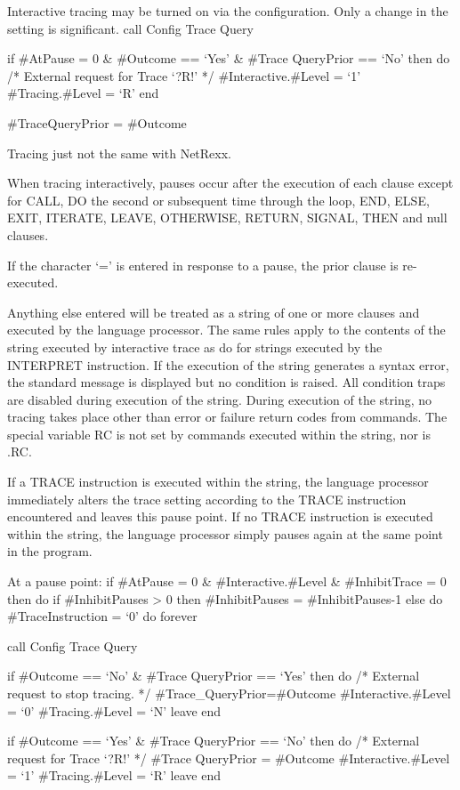 Interactive tracing may be turned on via the configuration. Only a
change in the setting is significant. call Config Trace Query

if \#AtPause = 0 \& \#Outcome == `Yes' \& \#Trace QueryPrior == `No'
then do /* External request for Trace `?R!' */ \#Interactive.\#Level =
`1' \#Tracing.\#Level = `R' end

\#TraceQueryPrior = \#Outcome

Tracing just not the same with NetRexx.

When tracing interactively, pauses occur after the execution of each
clause except for CALL, DO the second or subsequent time through the
loop, END, ELSE, EXIT, ITERATE, LEAVE, OTHERWISE, RETURN, SIGNAL, THEN
and null clauses.

If the character `=' is entered in response to a pause, the prior clause
is re-executed.

Anything else entered will be treated as a string of one or more clauses
and executed by the language processor. The same rules apply to the
contents of the string executed by interactive trace as do for strings
executed by the INTERPRET instruction. If the execution of the string
generates a syntax error, the standard message is displayed but no
condition is raised. All condition traps are disabled during execution
of the string. During execution of the string, no tracing takes place
other than error or failure return codes from commands. The special
variable RC is not set by commands executed within the string, nor is
.RC.

If a TRACE instruction is executed within the string, the language
processor immediately alters the trace setting according to the TRACE
instruction encountered and leaves this pause point. If no TRACE
instruction is executed within the string, the language processor simply
pauses again at the same point in the program.

At a pause point: if \#AtPause = 0 \& \#Interactive.\#Level \&
\#InhibitTrace = 0 then do if \#InhibitPauses \textgreater{} 0 then
\#InhibitPauses = \#InhibitPauses-1 else do \#TraceInstruction = `0' do
forever

call Config Trace Query

if \#Outcome == `No' \& \#Trace QueryPrior == `Yes' then do /* External
request to stop tracing. */ \#Trace\_QueryPrior=\#Outcome
\#Interactive.\#Level = `0' \#Tracing.\#Level = `N' leave end

if \#Outcome == `Yes' \& \#Trace QueryPrior == `No' then do /* External
request for Trace `?R!' */ \#Trace QueryPrior = \#Outcome
\#Interactive.\#Level = `1' \#Tracing.\#Level = `R' leave end


